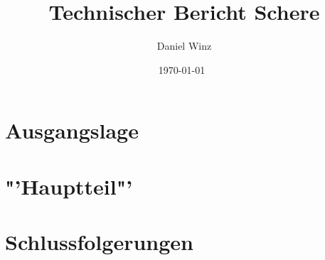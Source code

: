 \documentclass[a4paper,10pt,fleqn]{article}
\title{Technischer Bericht Schere}
\author{Daniel Winz}
\date{\today~\dtc}
\begin{document}
\maketitle

% 

\tableofcontents
\newpage

% 
\section{Ausgangslage}


\section{"'Hauptteil"'}

\section{Schlussfolgerungen}
\end{document}
